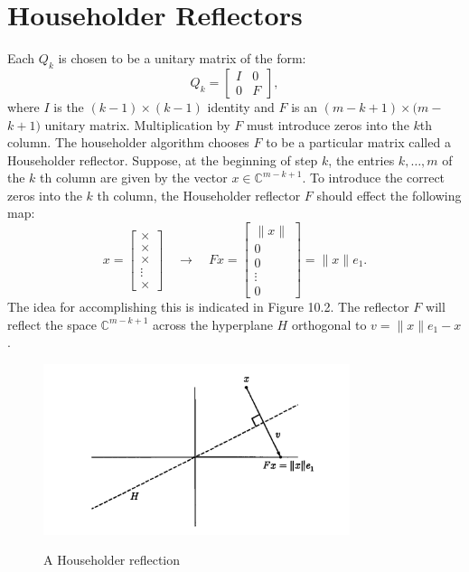 \section{Householder Reflectors} 
Each $Q_k$ is chosen to be a unitary matrix of the form: 
\[
    Q_k=\left[\begin{array}{ll}
        I & 0 \\
        0 & F
        \end{array}\right],
\]
where $I$ is the $(k-1) \times(k-1)$ identity and $F$ is an $(m-k+1) \times(m-$ $k+1)$ unitary matrix. Multiplication by $F$ must introduce zeros into the $k$th column. The householder algorithm chooses $F$ to be a particular matrix called a Householder reflector.  Suppose, at the beginning of step $k$, the entries $k, \ldots, m$ of the $k$ th column are given by the vector $x \in \mathbb{C}^{m-k+1}$. To introduce the correct zeros into the $k$ th column, the Householder reflector $F$ should effect the following map:
$$
x=\left[\begin{array}{c}
\times \\
\times \\
\times \\
\vdots \\
\times
\end{array}\right] \quad \longrightarrow \quad F x=\left[\begin{array}{c}
\|x\| \\
0 \\
0 \\
\vdots \\
0
\end{array}\right]=\|x\| e_1 .
$$
The idea for accomplishing this is indicated in Figure 10.2. The reflector $F$ will reflect the space $\mathbb{C}^{m-k+1}$ across the hyperplane $H$ orthogonal to $v=\|x\| e_1-x$. 

\begin{figure}[H]
    \centering
    \includegraphics[width=0.8\textwidth]{figures/10-2.png}
    \label{fig 10-2}
    \caption{A Householder reflection} 
\end{figure}

